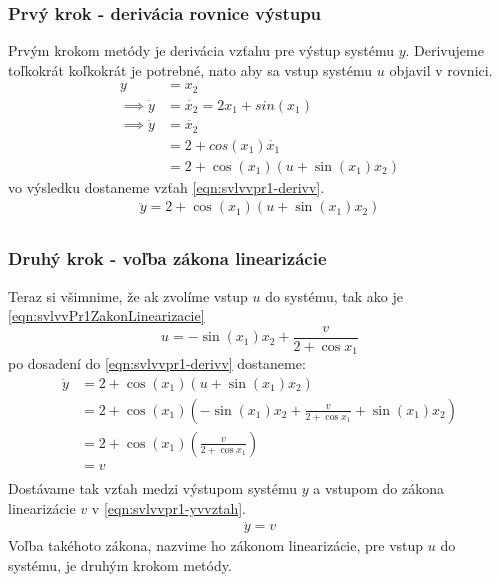 \documentclass[../main.tex]{subfiles}
\begin{document}
    \subsubsection{Prvý krok - derivácia rovnice výstupu}
    Prvým krokom metódy je derivácia vzťahu pre výstup systému $y$. Derivujeme toľkokrát koľkokrát je potrebné, nato aby sa vstup systému $u$ objavil v rovnici.
	\begin{equation*}
	\begin{aligned}
		y &= x_2 \\ 
		\implies \dot{y}  &= \dot{x_2} =  2x_1 + sin(x_1) \\
		\implies \ddot{y} &= \ddot{x_2} \\
						  &= 2 + cos(x_1)\dot{x_1} \\
						  &= 2 + \cos(x_1)(u + \sin(x_1) x_2)
		\end{aligned}
		\label{eqn:}
	\end{equation*}
    vo výsledku dostaneme vzťah \cref{eqn:svlvvpr1-derivv}.
    \begin{equation}
        \begin{aligned}
            \ddot{y} = 2 + \cos(x_1)(u + \sin(x_1) x_2) \\
        \end{aligned}
        \label{eqn:svlvvpr1-derivv}
    \end{equation} 

    \subsubsection{Druhý krok - voľba zákona linearizácie}
	Teraz si všimnime, že ak zvolíme vstup $u$ do systému, tak ako je \cref{eqn:svlvvPr1ZakonLinearizacie} 
	\begin{equation}
	    u = -\sin(x_1) x_2  +  \frac{v}{2 + \cos x_1}
	    \label{eqn:svlvvPr1ZakonLinearizacie}
	\end{equation}
po dosadení do \cref{eqn:svlvvpr1-derivv} dostaneme:%
	\begin{equation*}
	\begin{aligned}
	 	\ddot{y} &= 2 + \cos(x_1)(u + \sin(x_1) x_2) \\
	 		     &= 2 + \cos(x_1)(-\sin(x_1) x_2  +  \frac{v}{2 + \cos x_1} + \sin(x_1) x_2)  \\ 
	 		     &= 2 + \cos(x_1)(\frac{v}{2 + \cos x_1})  \\ 
	 		     &= v  \\ 
 	\end{aligned}
	\end{equation*}
    Dostávame tak vzťah medzi výstupom systému $y$ a vstupom do zákona linearizácie $v$ v \cref{eqn:svlvvpr1-yvvztah}.
    \begin{equation}
        \begin{aligned}
            \ddot{y} = v
        \end{aligned}
        \label{eqn:svlvvpr1-yvvztah}
    \end{equation} 
     Voľba takéhoto zákona, nazvime ho zákonom linearizácie, pre vstup $u$ do systému, je druhým krokom metódy.
\end{document}
